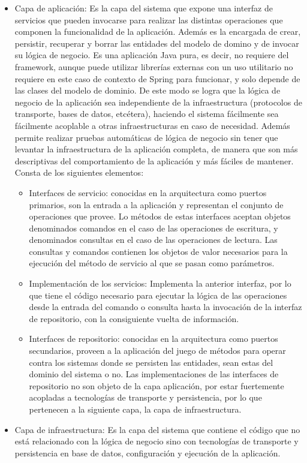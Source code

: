 \documentclass[a4paper, 12pt]{book}
\begin{document}
\begin{itemize}
        \item Capa de aplicación: Es la capa del sistema que expone una interfaz de servicios que pueden invocarse para realizar las distintas operaciones que componen la funcionalidad de la aplicación. Además es la encargada de crear, persistir, recuperar y borrar las entidades del modelo de domino y de invocar su lógica de negocio.
        Es una aplicación Java pura, es decir, no requiere del framework, aunque puede utilizar librerías externas con un uso utilitario no requiere en este caso de contexto de Spring para funcionar, y solo depende de las clases del modelo de dominio.
        De este modo se logra que la lógica de negocio de la aplicación sea independiente de la infraestructura (protocolos de transporte, bases de datos, etcétera), haciendo el sistema fácilmente sea fácilmente acoplable a otras infraestructuras en caso de necesidad.
        Además permite realizar pruebas automáticas de lógica de negocio sin tener que levantar la infraestructura de la aplicación completa, de manera que son más descriptivas del comportamiento de la aplicación y más fáciles de mantener.
        Consta de los siguientes elementos:

        \begin{itemize}
            \item Interfaces de servicio: conocidas en la arquitectura como puertos primarios, son la entrada a la aplicación y representan el conjunto de operaciones que provee. Lo métodos de estas interfaces aceptan objetos denominados comandos en el caso de las operaciones de escritura, y denominados consultas en el caso de las operaciones de lectura.
            Las consultas y comandos contienen los objetos de valor necesarios para la ejecución del método de servicio al que se pasan como parámetros.
            \item Implementación de los servicios: Implementa la anterior interfaz, por lo que tiene el código necesario para ejecutar la lógica de las operaciones desde la entrada del comando o consulta hasta la invocación de la interfaz de repositorio, con la consiguiente vuelta de información.
            \item Interfaces de repositorio: conocidas en la arquitectura como puertos secundarios, proveen a la aplicación del juego de métodos para operar contra los sistemas donde se persisten las entidades, sean estas del dominio del sistema o no.
            Las implementaciones de las interfaces de repositorio no son objeto de la capa aplicación, por estar fuertemente acopladas a tecnologías de transporte y persistencia, por lo que pertenecen a la siguiente capa, la capa de infraestructura.
        \end{itemize}


        \item Capa de infraestructura: Es la capa del sistema que contiene el código que no está relacionado con la lógica de negocio sino con tecnologías de transporte y persistencia en base de datos, configuración y ejecución de la aplicación.
    \end{itemize}
\end{document}
